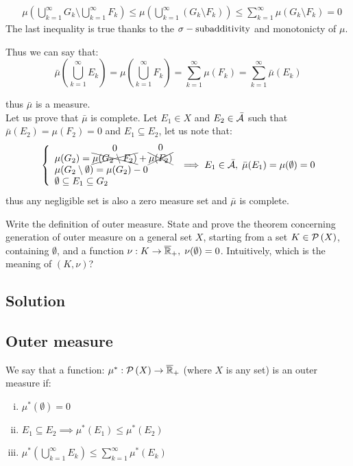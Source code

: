 \begin{itemize}
\begin{enumerate}[i)]
\begin{itemize}
\begin{align*}
                                   & \mu\left(\bigcup_{k=1}^{\infty} G_k \setminus \bigcup_{k=1}^{\infty} F_k \right) \leq \mu\left(\bigcup_{k=1}^{\infty} (G_k \setminus F_k )\right) \leq \sum_{k=1}^{\infty} \mu(G_k\setminus F_k) = 0
                              \end{align*}
                              The last inequality is true thanks to the $\sigma-\text{subadditivity}$ and monotonicty of $\mu$.
                    \end{itemize}
                    Thus we can say that:
                    \[
                        \bar{\mu}\left( \bigcup_{k=1}^{\infty} E_k \right) = \mu \left( \bigcup_{k=1}^{\infty} F_k \right) = \sum_{k=1}^{\infty} \mu(F_k) = \sum_{k=1}^{\infty} \bar{\mu}(E_k)
                    \]
          \end{enumerate}
          thus $\bar{\mu}$ is a measure.\\
          Let us prove that $\bar{\mu}$ is complete.
          Let $E_1 \in X$ and $E_2 \in \bar{\mathcal{A}}$ such that $\bar{\mu}(E_2)=\mu(F_2)=0$ and $E_1 \subseteq E_2$, let us note that:
          \[
              \left\{ \begin{array}{l}
                  \mu(G_2) = \overset{\text{\normalsize0}}{\xcancel{\mu(G_2\setminus F_2)}} + \overset{\text{\normalsize0}}{\xcancel{\mu(F_2)}}\\
                  \mu(G_2 \setminus \emptyset) = \mu(G_2) - 0                       \\
                  \emptyset \subseteq E_1 \subseteq G_2
              \end{array} \right. \implies E_1\in \bar{\mathcal{A}}, \; \bar{\mu}(E_1)=\mu(\emptyset) = 0
          \]
          thus any negligible set is also a zero measure set and $\bar{\mu}$ is complete.
\end{itemize}


\question
Write the definition of outer measure. State and prove the theorem concerning generation of
outer measure on a general set $X$, starting from a set $K \in\mathcal{P}\left(X\right)$, containing $\emptyset$, and a function
$\nu : K \to \overline{\mathbb{R}}_{+}, \; \nu(\emptyset) = 0$. Intuitively, which is the meaning of $(K, \nu)$?

\subsection*{Solution}

\subsection{Outer measure}\label{outer:def}
We say that a function: $\mu^*:\mathcal{P}\left(X\right)\to\overline{\mathbb{R}}_{+}$ (where $X$ is any set) is an outer measure if:
\begin{enumerate}[i)]
    \item $\mu^*(\emptyset)=0$
    \item \label{outer:mono}$E_1\subseteq E_2 \implies \mu^*(E_1) \leq \mu^*(E_2)$
    \item \label{outer:sub}$\mu^*\left( \bigcup_{k=1}^{\infty} E_k \right) \leq \sum_{k=1}^{\infty} \mu^*(E_k)$
\end{enumerate}


